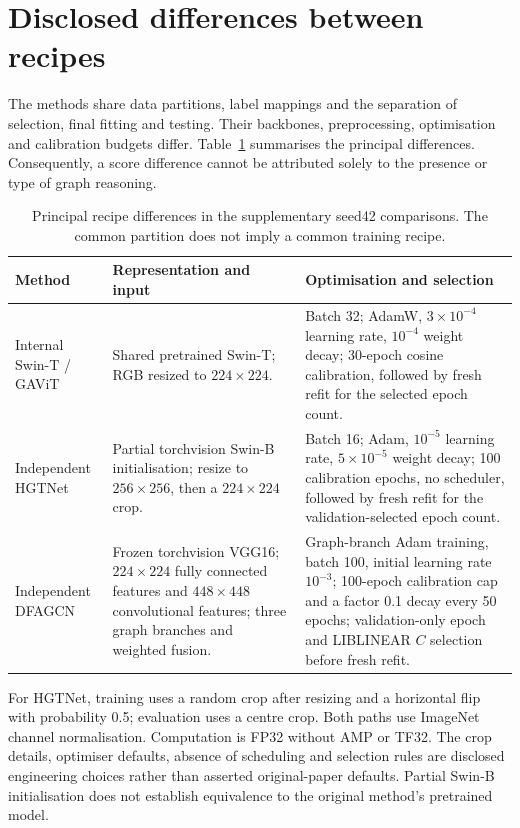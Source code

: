 \section{Disclosed differences between recipes}

The methods share data partitions, label mappings and the separation of
selection, final fitting and testing. Their backbones, preprocessing,
optimisation and calibration budgets differ. Table~\ref{tab:external-recipes}
summarises the principal differences. Consequently, a score difference
cannot be attributed solely to the presence or type of graph reasoning.

\begin{table}[tbp]
 \centering
 \caption{Principal recipe differences in the supplementary seed42
 comparisons. The common partition does not imply a common training recipe.}
 \label{tab:external-recipes}
 \small
 \setlength{\tabcolsep}{4pt}
 \begin{tabular}{p{}p{}p{}}
  \toprule
  Method & Representation and input & Optimisation and selection\\
  \midrule
  Internal Swin-T / GAViT & Shared pretrained Swin-T;
  RGB resized to $224\times224$. & Batch 32; AdamW,
  $3\times10^{-4}$ learning rate, $10^{-4}$ weight decay;
  30-epoch cosine calibration, followed by fresh refit for the selected
  epoch count.\\[0.5em]
  Independent HGTNet & Partial torchvision Swin-B initialisation;
  resize to $256\times256$, then a $224\times224$ crop. & Batch 16;
  Adam, $10^{-5}$ learning rate, $5\times10^{-5}$ weight decay;
  100 calibration epochs, no scheduler, followed by fresh refit for the
  validation-selected epoch count.\\[0.5em]
  Independent DFAGCN & Frozen torchvision VGG16;
  $224\times224$ fully connected features and $448\times448$
  convolutional features; three graph branches and weighted fusion. &
  Graph-branch Adam training, batch 100, initial learning rate $10^{-3}$;
  100-epoch calibration cap and a factor 0.1 decay every 50 epochs;
  validation-only epoch and LIBLINEAR $C$ selection before fresh refit.\\
  \bottomrule
 \end{tabular}
\end{table}

For HGTNet, training uses a random crop after resizing and a horizontal flip
with probability 0.5; evaluation uses a centre crop. Both paths use
ImageNet channel normalisation. Computation is FP32 without AMP or TF32.
The crop details, optimiser defaults, absence of scheduling and selection
rules are disclosed engineering choices rather than asserted original-paper
defaults. Partial Swin-B initialisation does not establish equivalence to
the original method's pretrained model.


